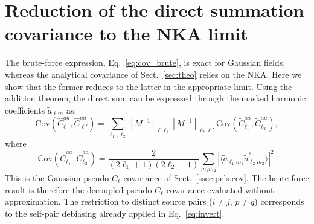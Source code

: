 \documentclass[aps,twocolumn, superscriptaddress, english, nofootinbib, 10pt]{revtex4-2}
\begin{document}
\section{Reduction of the direct summation covariance to the NKA limit}\label{app:brute_nka}
The brute-force expression, Eq.~\ref{eq:cov_brute}, is exact for Gaussian fields, whereas the analytical covariance of Sect.~\ref{sec:theo} relies on the NKA. Here we show that the former reduces to the latter in the appropriate limit.
Using the addition theorem, the direct sum can be expressed through the masked harmonic coefficients $\tilde{a}_{\ell m}$ as:
\begin{equation}\label{eq:brute_as_cov}
    \mathrm{Cov}(\hat{C}_\ell^{aa},\hat{C}_{\ell'}^{aa}) = \sum_{\ell_1,\ell_2}[M^{-1}]_{\ell\ell_1}[M^{-1}]_{\ell_2\ell'}\,\mathrm{Cov}(\tilde{C}_{\ell_1}^{aa},\tilde{C}_{\ell_2}^{aa}),
\end{equation}
where
\begin{equation}\label{eq:pcl_cov_harm}
    \mathrm{Cov}(\tilde{C}_{\ell_1}^{aa},\tilde{C}_{\ell_2}^{aa}) = \frac{2}{(2\ell_1+1)(2\ell_2+1)}\sum_{m_1 m_2}\left|\langle \tilde{a}_{\ell_1 m_1}\tilde{a}^*_{\ell_2 m_2}\rangle\right|^2.
\end{equation}
This is the Gaussian pseudo-$C_\ell$ covariance of Sect.~\ref{ssec:pcls.cov}. The brute-force result is therefore the decoupled pseudo-$C_\ell$ covariance evaluated without approximation. The restriction to distinct source pairs ($i\neq j$, $p\neq q$) corresponds to the self-pair debiasing already applied in Eq.~\ref{eq:invert}.
 
\end{document}
